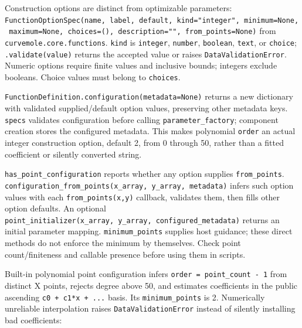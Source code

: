 \documentclass[
  10pt,
  a4paper,
  oneside]{scrreprt}
\begin{document}
Construction options are distinct from optimizable parameters:
\texttt{FunctionOptionSpec(name,\ label,\ default,\ kind="integer",\ minimum=None,\ maximum=None,\ choices=(),\ description="",\ from\_points=None)}
from \texttt{curvemole.core.functions}. \texttt{kind} is
\texttt{integer}, \texttt{number}, \texttt{boolean}, \texttt{text}, or
\texttt{choice}; \texttt{.validate(value)} returns the accepted value or
raises \texttt{DataValidationError}. Numeric options require finite
values and inclusive bounds; integers exclude booleans. Choice values
must belong to \texttt{choices}.

\texttt{FunctionDefinition.configuration(metadata=None)} returns a new
dictionary with validated supplied/default option values, preserving
other metadata keys. \texttt{specs} validates configuration before
calling \texttt{parameter\_factory}; component creation stores the
configured metadata. This makes polynomial \texttt{order} an actual
integer construction option, default 2, from 0 through 50, rather than a
fitted coefficient or silently converted string.

\texttt{has\_point\_configuration} reports whether any option supplies
\texttt{from\_points}.
\texttt{configuration\_from\_points(x\_array,\ y\_array,\ metadata)}
infers such option values with each \texttt{from\_points(x,y)} callback,
validates them, then fills other option defaults. An optional
\texttt{point\_initializer(x\_array,\ y\_array,\ configured\_metadata)}
returns an initial parameter mapping. \texttt{minimum\_points} supplies
host guidance; these direct methods do not enforce the minimum by
themselves. Check point count/finiteness and callable presence before
using them in scripts.

Built-in polynomial point configuration infers
\texttt{order\ =\ point\_count\ -\ 1} from distinct X points, rejects
degree above 50, and estimates coefficients in the public ascending
\texttt{c0\ +\ c1*x\ +\ ...} basis. Its \texttt{minimum\_points} is 2.
Numerically unreliable interpolation raises \texttt{DataValidationError}
instead of silently installing bad coefficients:
\end{document}
